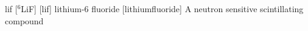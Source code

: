 \newglsXchemical%
{lif}%
[{}$^6$LiF]%
[lif]%
{lithium-6 fluoride}%
{}%
[lithiumfluoride]%
{A neutron sensitive scintillating compound}%
